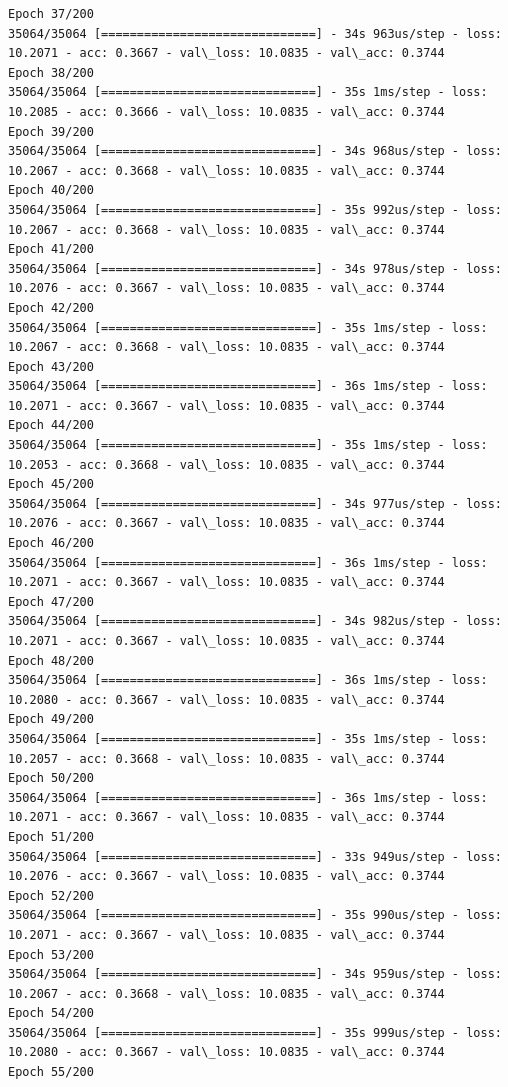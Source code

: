 \documentclass[11pt]{article}
\begin{document}
\begin{Verbatim}[commandchars=\\\{\}]
Epoch 37/200
35064/35064 [==============================] - 34s 963us/step - loss: 10.2071 - acc: 0.3667 - val\_loss: 10.0835 - val\_acc: 0.3744
Epoch 38/200
35064/35064 [==============================] - 35s 1ms/step - loss: 10.2085 - acc: 0.3666 - val\_loss: 10.0835 - val\_acc: 0.3744
Epoch 39/200
35064/35064 [==============================] - 34s 968us/step - loss: 10.2067 - acc: 0.3668 - val\_loss: 10.0835 - val\_acc: 0.3744
Epoch 40/200
35064/35064 [==============================] - 35s 992us/step - loss: 10.2067 - acc: 0.3668 - val\_loss: 10.0835 - val\_acc: 0.3744
Epoch 41/200
35064/35064 [==============================] - 34s 978us/step - loss: 10.2076 - acc: 0.3667 - val\_loss: 10.0835 - val\_acc: 0.3744
Epoch 42/200
35064/35064 [==============================] - 35s 1ms/step - loss: 10.2067 - acc: 0.3668 - val\_loss: 10.0835 - val\_acc: 0.3744
Epoch 43/200
35064/35064 [==============================] - 36s 1ms/step - loss: 10.2071 - acc: 0.3667 - val\_loss: 10.0835 - val\_acc: 0.3744
Epoch 44/200
35064/35064 [==============================] - 35s 1ms/step - loss: 10.2053 - acc: 0.3668 - val\_loss: 10.0835 - val\_acc: 0.3744
Epoch 45/200
35064/35064 [==============================] - 34s 977us/step - loss: 10.2076 - acc: 0.3667 - val\_loss: 10.0835 - val\_acc: 0.3744
Epoch 46/200
35064/35064 [==============================] - 36s 1ms/step - loss: 10.2071 - acc: 0.3667 - val\_loss: 10.0835 - val\_acc: 0.3744
Epoch 47/200
35064/35064 [==============================] - 34s 982us/step - loss: 10.2071 - acc: 0.3667 - val\_loss: 10.0835 - val\_acc: 0.3744
Epoch 48/200
35064/35064 [==============================] - 36s 1ms/step - loss: 10.2080 - acc: 0.3667 - val\_loss: 10.0835 - val\_acc: 0.3744
Epoch 49/200
35064/35064 [==============================] - 35s 1ms/step - loss: 10.2057 - acc: 0.3668 - val\_loss: 10.0835 - val\_acc: 0.3744
Epoch 50/200
35064/35064 [==============================] - 36s 1ms/step - loss: 10.2071 - acc: 0.3667 - val\_loss: 10.0835 - val\_acc: 0.3744
Epoch 51/200
35064/35064 [==============================] - 33s 949us/step - loss: 10.2076 - acc: 0.3667 - val\_loss: 10.0835 - val\_acc: 0.3744
Epoch 52/200
35064/35064 [==============================] - 35s 990us/step - loss: 10.2071 - acc: 0.3667 - val\_loss: 10.0835 - val\_acc: 0.3744
Epoch 53/200
35064/35064 [==============================] - 34s 959us/step - loss: 10.2067 - acc: 0.3668 - val\_loss: 10.0835 - val\_acc: 0.3744
Epoch 54/200
35064/35064 [==============================] - 35s 999us/step - loss: 10.2080 - acc: 0.3667 - val\_loss: 10.0835 - val\_acc: 0.3744
Epoch 55/200

\end{Verbatim}
\end{document}
